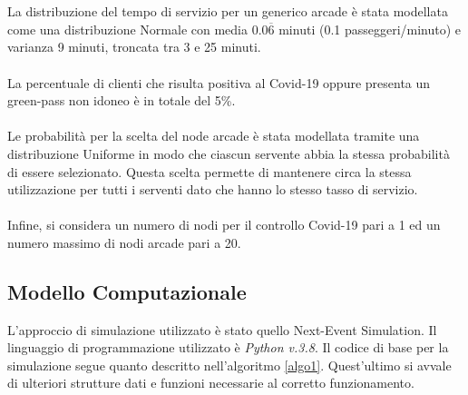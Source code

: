 \documentclass{article}
\begin{document}
\\ \\
La distribuzione del tempo di servizio per un generico arcade è stata modellata
come una distribuzione Normale con media $0.0\overline{6}$ minuti (0.1 passeggeri/minuto) e varianza 9 minuti, troncata tra 3 e 25 minuti.
\\ \\
La percentuale di clienti che risulta positiva al Covid-19 oppure presenta un green-pass non idoneo è in totale del 5\%.
\\ \\
Le probabilità per la scelta del node arcade è stata modellata tramite una distribuzione Uniforme in modo che ciascun servente abbia la stessa probabilità di essere selezionato. Questa scelta permette di mantenere circa la stessa utilizzazione per tutti i serventi dato che hanno lo stesso tasso di servizio.
\\ \\
Infine, si considera un numero di nodi per il controllo Covid-19 pari a 1 ed un numero massimo di nodi arcade pari a 20.


\subsection{Modello Computazionale}
L’approccio di simulazione utilizzato è stato quello Next-Event Simulation. Il linguaggio di programmazione utilizzato è \textit{Python v.3.8}.
Il codice di base per la simulazione segue quanto descritto nell'algoritmo \ref{algo1}. Quest'ultimo si avvale di ulteriori strutture dati e funzioni necessarie al corretto funzionamento.
\end{document}
